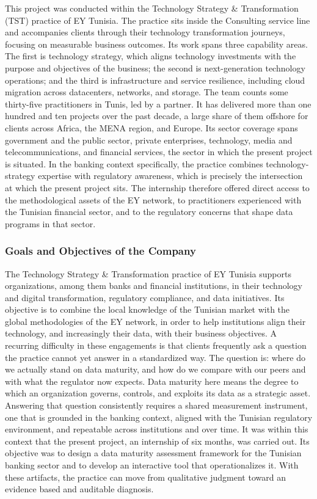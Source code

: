 This project was conducted within the Technology Strategy \& Transformation (TST) practice of EY Tunisia. The practice sits inside the Consulting service line and accompanies clients through their technology transformation journeys, focusing on measurable business outcomes. Its work spans three capability areas. The first is technology strategy, which aligns technology investments with the purpose and objectives of the business; the second is next-generation technology operations; and the third is infrastructure and service resilience, including cloud migration across datacenters, networks, and storage. The team counts some thirty-five practitioners in Tunis, led by a partner. It has delivered more than one hundred and ten projects over the past decade, a large share of them offshore for clients across Africa, the MENA region, and Europe. Its sector coverage spans government and the public sector, private enterprises, technology, media and telecommunications, and financial services, the sector in which the present project is situated. In the banking context specifically, the practice combines technology-strategy expertise with regulatory awareness, which is precisely the intersection at which the present project sits. The internship therefore offered direct access to the methodological assets of the EY network, to practitioners experienced with the Tunisian financial sector, and to the regulatory concerns that shape data programs in that sector.

\subsubsection{Goals and Objectives of the Company}

The Technology Strategy \& Transformation practice of EY Tunisia supports organizations, among them banks and financial institutions, in their technology and digital transformation, regulatory compliance, and data initiatives. Its objective is to combine the local knowledge of the Tunisian market with the global methodologies of the EY network, in order to help institutions align their technology, and increasingly their data, with their business objectives. A recurring difficulty in these engagements is that clients frequently ask a question the practice cannot yet answer in a standardized way. The question is: where do we actually stand on data maturity, and how do we compare with our peers and with what the regulator now expects. Data maturity here means the degree to which an organization governs, controls, and exploits its data as a strategic asset. Answering that question consistently requires a shared measurement instrument, one that is grounded in the banking context, aligned with the Tunisian regulatory environment, and repeatable across institutions and over time. It was within this context that the present project, an internship of six months, was carried out. Its objective was to design a data maturity assessment framework for the Tunisian banking sector and to develop an interactive tool that operationalizes it. With these artifacts, the practice can move from qualitative judgment toward an evidence based and auditable diagnosis.

